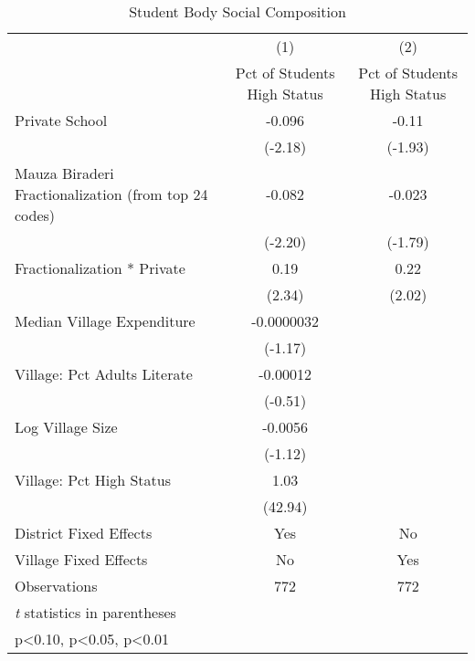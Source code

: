 \begin{table}[htbp]\centering
\def\sym#1{\ifmmode^{#1}\else\(^{#1}\)\fi}
\caption{Student Body Social Composition\label{highpooling}}
\begin{tabular}{l*{2}{c}}
\toprule
                &\multicolumn{1}{c}{(1)}&\multicolumn{1}{c}{(2)}\\
                &\multicolumn{1}{c}{Pct of Students High Status}&\multicolumn{1}{c}{Pct of Students High Status}\\
\midrule
Private School  &   -0.096\*\*  &    -0.11\*    \\
                &  (-2.18)      &  (-1.93)      \\
Mauza Biraderi Fractionalization (from top 24 codes)&   -0.082\*\*  &   -0.023\*    \\
                &  (-2.20)      &  (-1.79)      \\
Fractionalization * Private&     0.19\*\*  &     0.22\*\*  \\
                &   (2.34)      &   (2.02)      \\
Median Village Expenditure&-0.0000032      &               \\
                &  (-1.17)      &               \\
Village: Pct Adults Literate& -0.00012      &               \\
                &  (-0.51)      &               \\
Log Village Size&  -0.0056      &               \\
                &  (-1.12)      &               \\
Village: Pct High Status&     1.03\*\*\*&               \\
                &  (42.94)      &               \\
District Fixed Effects&      Yes      &       No      \\
Village Fixed Effects&       No      &      Yes      \\
\midrule
Observations    &      772      &      772      \\
\bottomrule
\multicolumn{3}{l}{\footnotesize \textit{t} statistics in parentheses}\\
\multicolumn{3}{l}{\footnotesize \* p<0.10, \*\* p<0.05, \*\*\* p<0.01}\\
\end{tabular}
\end{table}
